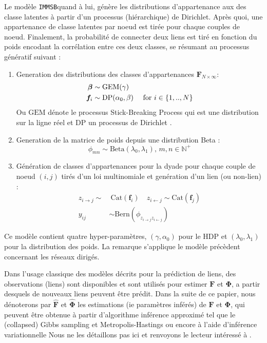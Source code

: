 \documentclass[french]{hermes-journal}
\renewcommand{\text}{\textnormal}
\newcommand{\immsb}{\texttt{IMMSB}}
\newcommand{\gem}{\mathrm{GEM}}
\newcommand{\DP}{\mathrm{DP}}
\newcommand{\mat}[1]{\bm{#1}}
\begin{document}
Le modèle \immsb quand à lui, génère les distributions d'appartenance aux des classe latentes à partir d'un processus (hiérarchique) de Dirichlet. Après quoi, une appartenance de classe latentes par noeud est tirée pour chaque couples de noeud. Finalement, la probabilité de connecter deux liens est tiré en fonction du poids encodant la corrélation entre ces deux classes, se résumant au processus génératif suivant :
\begin{enumerate}
\item Generation des distributions des classes d'appartenances $\mat{F}_{N \times \infty}$:
   \begin{align}
       \bm{\beta} &\sim \gem(\gamma) \nonumber \\
    \mat{f}_i &\sim \DP(\alpha_0, \beta) \quad\text{ for }  i \in \{1, .., N\} \nonumber
   \end{align}  Ou $\gem$ dénote le processus Stick-Breaking Process qui est une distribution sur la ligne réel et $\DP$ un processus de Dirichlet \cite{HDP}.
\item Generation de la matrice de poids depuis une distribution Beta :\\
\[ \phi_{mn} \sim \mathrm{Beta}(\lambda_0,\lambda_1), \, m,n \in \mathbb{N}^{+} \]
\item Génération de classes d'appartenances pour la dyade pour chaque couple de noeud $(i,j)$ tirés d'un loi multinomiale et genération d'un lien (ou non-lien) : 
   \begin{align}
       z_{i \rightarrow j} \sim&\ \mbox{Cat}(\mat{f}_i) \quad z_{i \leftarrow j} \sim \mbox{Cat}(\mat{f}_j) \nonumber \\
       y_{ij} &\sim \mathrm{Bern}(\phi_{z_{i \rightarrow j}z_{i \leftarrow j}}) \nonumber
    \label{eq:link-immsb}
   \end{align}
\end{enumerate}


Ce modèle contient quatre hyper-paramètres, $(\gamma, \alpha_0)$ pour le HDP et $(\lambda_0, \lambda_1)$ pour la distribution des poids. La remarque s'applique le modèle précèdent concernant les réseaux dirigés.

Dans l'usage classique des modèles décrits pour la prédiction de liens, des observations (liens) sont disponibles et sont utilisés pour estimer  $\mat{F}$ et $\mat{\Phi}$, a partir desquels de nouveaux liens peuvent être prédit. Dans la suite de ce papier, nous dénoterons par $\mat{\hat{F}}$ et $\mat{\hat{\Phi}}$ les estimations (ie paramètres inférés) de $\mat{F}$ et $\mat{\Phi}$, qui peuvent être obtenue à partir d'algorithme inférence approximé tel que le (collapsed) Gibbs sampling et Metropolis-Hastings ou encore à l'aide d'inférence variationnelle Nous ne les détaillons pas ici et renvoyons le lecteur intéressé à \cite{ILFRM,IBP,HDP,fan2015dynamic}.
\end{document}
